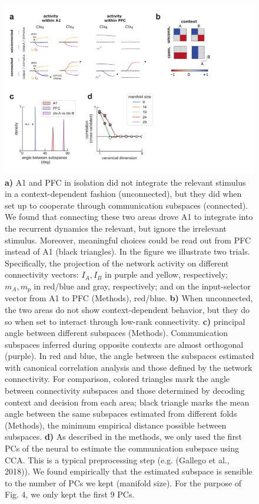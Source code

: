 \documentclass[12pt]{article}
\begin{document}
\begin{figure}
\centering
        \includegraphics[width=\textwidth]{figures/FigS4.pdf}
    \caption{\textbf{a)} A1 and PFC in isolation did not integrate the relevant stimulus in a context-dependent fashion (unconnected), but they did when set up to cooperate through communication subspaces (connected). We found that connecting these two areas drove A1 to integrate into the recurrent dynamics the relevant, but ignore the irrelevant stimulus. Moreover, meaningful choices could be read out from PFC instead of A1 (black triangles). In the figure we illustrate two trials. Specifically, the projection of the network activity on different connectivity vectors: $I_A,I_B$ in purple and yellow, respectively;  $m_A,m_p$ in red/blue and gray, respectively; and on the input-selector vector from A1 to PFC (Methods), red/blue. \textbf{b)} When unconnected, the two areas do not show context-dependent behavior, but they do so when set to interact through low-rank connectivity. \textbf{c)} principal angle between different subspaces (Methods). Communication subspaces inferred during opposite contexts are almost orthogonal (purple). In red and blue, the angle between the subspaces estimated with canonical correlation analysis and those defined by the network connectivity. For comparison, colored triangles mark the angle between connectivity subspaces and those determined by decoding context and decision from each area; black triangle marks the mean angle between the same subspaces estimated from different folds (Methods), the minimum empirical distance possible between subspaces.  \textbf{d)} As described in the methods, we only used the first PCs of the neural to estimate the communication subspace using CCA. This is a typical preprocessing step (e.g. (Gallego et al., 2018)). We found empirically that the estimated subspace is sensible to the number of PCs we kept (manifold size). For the purpose of Fig. 4, we only kept the first 9 PCs.} 
    \label{figS4}
\end{figure}
\end{document}
